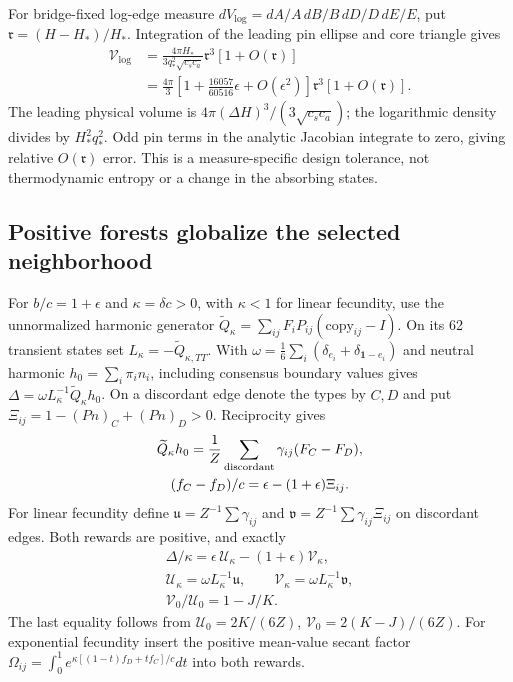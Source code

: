 \documentclass[aps,pre,reprint,amsmath,amssymb,longbibliography]{revtex4-2}
\begin{document}
For bridge-fixed log-edge measure $dV_{\log}=dA/A\,dB/B\,dD/D\,dE/E$, put
$\mathfrak r=(H-H_*)/H_*$. Integration of the leading pin ellipse and core
triangle gives
\begin{equation}
 \begin{aligned}
 \mathcal V_{\log}
 &=\frac{4\pi H_*}{3q_*^2\sqrt{c_sc_a}}\mathfrak r^3[1+O(\mathfrak r)]\\
 &=\frac{4\pi}{3}\left[1+\frac{16057}{60516}\epsilon+O(\epsilon^2)\right]
       \mathfrak r^3[1+O(\mathfrak r)].
 \end{aligned}
 \label{v3-eq-full-tolerance-volume}
\end{equation}
The leading physical volume is $4\pi(\Delta H)^3/(3\sqrt{c_sc_a})$; the
logarithmic density divides by $H_*^2q_*^2$. Odd pin terms in the analytic
Jacobian integrate to zero, giving relative $O(\mathfrak r)$ error. This is a
measure-specific design tolerance, not thermodynamic entropy or a change
in the absorbing states.

\subsection{Positive forests globalize the selected neighborhood}
\label{v3-app-selected-global-localization}
For $b/c=1+\epsilon$ and $\kappa=\delta c>0$, with $\kappa<1$
for linear fecundity, use the unnormalized harmonic
generator $\widetilde Q_\kappa=\sum_{ij}F_iP_{ij}(\mathrm{copy}_{ij}-I)$.
On its 62 transient states set $L_\kappa=-\widetilde Q_{\kappa,TT}$.
With $\omega=\frac16\sum_i(\delta_{e_i}+\delta_{\boldsymbol1-e_i})$
and neutral harmonic $h_0=\sum_i\pi_i n_i$, including consensus boundary
values gives $\Delta=\omega L_\kappa^{-1}\widetilde Q_\kappa h_0$.
On a discordant edge denote the types by $C,D$ and put
$\Xi_{ij}=1-(Pn)_C+(Pn)_D>0$. Reciprocity gives
\begin{equation}
 \begin{gathered}\widetilde Q_\kappa h_0=\frac1Z\sum_{\rm discordant}\gamma_{ij}(F_C-F_D),\\
 (f_C-f_D)/c=\epsilon-(1+\epsilon)\Xi_{ij}.\end{gathered}
\end{equation}
For linear fecundity define $\mathfrak u=Z^{-1}\sum \gamma_{ij}$ and
$\mathfrak v=Z^{-1}\sum \gamma_{ij}\Xi_{ij}$ on discordant edges. Both rewards are positive,
and exactly
\begin{equation}
 \begin{gathered}
 \Delta/\kappa=\epsilon\,\mathcal U_\kappa-(1+\epsilon)\mathcal V_\kappa,\\
 \mathcal U_\kappa=\omega L_\kappa^{-1}\mathfrak u,\qquad
 \mathcal V_\kappa=\omega L_\kappa^{-1}\mathfrak v,\\
 \mathcal V_0/\mathcal U_0=1-J/K.
 \end{gathered}
\end{equation}
The last equality follows from
$\mathcal U_0=2K/(6Z)$, $\mathcal V_0=2(K-J)/(6Z)$.
For exponential fecundity insert the positive mean-value secant factor
$\Omega_{ij}=\int_0^1e^{\kappa[(1-t)f_D+t f_C]/c}dt$ into both rewards.
\end{document}
